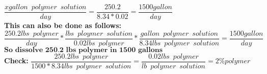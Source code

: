 \begin{enumerate}
\vspace{0.25cm}
$\dfrac{x gallon \enspace polymer \enspace solution}{day}=\dfrac{250.2}{8.34*0.02}=\boxed{\dfrac{1500 gallon}{day}}$\\
\vspace{0.25cm}
\textbf{This can also be done as follows:}\\
\vspace{0.25cm}
$\dfrac{250.2 lbs \enspace polymer}{day}*\dfrac{lbs \enspace ploymer \enspace solution}{0.02 lbs \enspace polymer}*\dfrac{gallon \enspace polymer \enspace solution}{8.34 lbs \enspace polymer \enspace solution}=\boxed{\dfrac{1500 gallon}{day}}$\\
\vspace{0.25cm}
$\boxed{\textbf{So dissolve 250.2 lbs polymer in 1500 gallons}}$\\
\vspace{0.25cm}
\textbf{Check:}
$\dfrac{250.2lbs \enspace polymer}{1500*8.34 lbs \enspace polymer \enspace solution}=\dfrac{0.02 lbs \enspace polymer}{lb \enspace polymer \enspace solution}=2\% polymer$
\vspace{0.25cm}


\end{enumerate}

